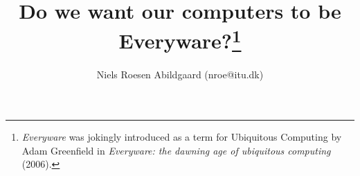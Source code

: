 \title{Do we want our computers to be Everyware?\footnote{\emph{Everyware} was jokingly introduced as a term for Ubiquitous Computing by Adam Greenfield in \emph{Everyware: the dawning age of ubiquitous computing} (2006).}}
\author{Niels Roesen Abildgaard (nroe@itu.dk)}
\maketitle
